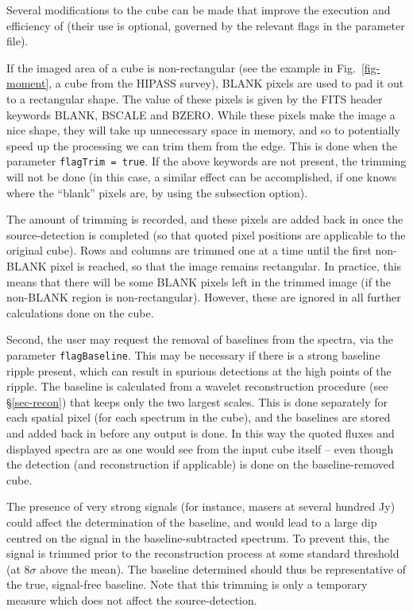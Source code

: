 \label{sec-modify}

Several modifications to the cube can be made that improve the
execution and efficiency of \duchamp (their use is optional, governed
by the relevant flags in the parameter file).

\label{sec-blank}

If the imaged area of a cube is non-rectangular (see the example in
Fig.~\ref{fig-moment}, a cube from the HIPASS survey), BLANK pixels
are used to pad it out to a rectangular shape. The value of these
pixels is given by the FITS header keywords BLANK, BSCALE and
BZERO. While these pixels make the image a nice shape, they will take
up unnecessary space in memory, and so to potentially speed up the
processing we can trim them from the edge. This is done when the
parameter \texttt{flagTrim = true}. If the above keywords are not
present, the trimming will not be done (in this case, a similar effect
can be accomplished, if one knows where the ``blank'' pixels are, by
using the subsection option).

The amount of trimming is recorded, and these pixels are added back in
once the source-detection is completed (so that quoted pixel positions
are applicable to the original cube). Rows and columns are trimmed one
at a time until the first non-BLANK pixel is reached, so that the
image remains rectangular. In practice, this means that there will be
some BLANK pixels left in the trimmed image (if the non-BLANK region
is non-rectangular). However, these are ignored in all further
calculations done on the cube.


Second, the user may request the removal of baselines from the
spectra, via the parameter \texttt{flagBaseline}. This may be
necessary if there is a strong baseline ripple present, which can
result in spurious detections at the high points of the ripple. The
baseline is calculated from a wavelet reconstruction procedure (see
\S\ref{sec-recon}) that keeps only the two largest scales. This is
done separately for each spatial pixel (\ie for each spectrum in the
cube), and the baselines are stored and added back in before any
output is done. In this way the quoted fluxes and displayed spectra
are as one would see from the input cube itself -- even though the
detection (and reconstruction if applicable) is done on the
baseline-removed cube.

The presence of very strong signals (for instance, masers at several
hundred Jy) could affect the determination of the baseline, and would
lead to a large dip centred on the signal in the baseline-subtracted
spectrum. To prevent this, the signal is trimmed prior to the
reconstruction process at some standard threshold (at $8\sigma$ above
the mean). The baseline determined should thus be representative of
the true, signal-free baseline. Note that this trimming is only a
temporary measure which does not affect the source-detection.

